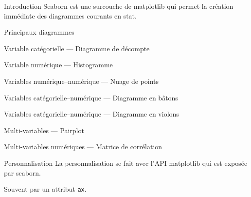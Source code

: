 \begin{frame}{Introduction}
  Seaborn est une surcouche de matplotlib qui permet la création immédiate des diagrammes courants en stat.
\end{frame}

\begin{frame}{Principaux diagrammes}
\end{frame}

\begin{frame}{Variable catégorielle — Diagramme de décompte}
\end{frame}

\begin{frame}{Variable numérique — Histogramme}
\end{frame}

\begin{frame}{Variables numérique–numérique — Nuage de points}
\end{frame}

\begin{frame}{Variables catégorielle–numérique — Diagramme en bâtons}
\end{frame}

\begin{frame}{Variables catégorielle–numérique — Diagramme en violons}
\end{frame}

\begin{frame}{Multi-variables — Pairplot}
\end{frame}

\begin{frame}{Multi-variables numériques — Matrice de corrélation}
\end{frame}

\begin{frame}{Personnalisation}
  La personnalisation se fait avec l'API matplotlib qui est exposée par seaborn.

  Souvent par un attribut \texttt{ax}.
\end{frame}